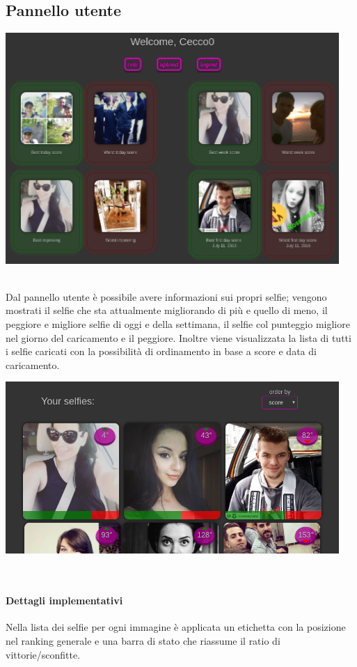 \documentclass{article}
\begin{document}
\subsection{Pannello utente}
\begin{center}\includegraphics[width=0.95\textwidth]{res/panel.png}\end{center}\\
Dal pannello utente è possibile avere informazioni sui propri selfie; vengono mostrati il selfie che sta attualmente
migliorando di più e quello di meno, il peggiore e migliore selfie di oggi e della settimana, il selfie col punteggio migliore
nel giorno del caricamento e il peggiore. Inoltre viene visualizzata la lista di tutti i selfie caricati con la possibilità
di ordinamento in base a score e data di caricamento.
\begin{center}\includegraphics[width=0.95\textwidth]{res/panel2.png}\end{center}\\

\paragraph{Dettagli implementativi}
Nella lista dei selfie per ogni immagine è applicata un etichetta con la posizione nel ranking generale e una barra di
stato che riassume il ratio di vittorie/sconfitte.
\end{document}
